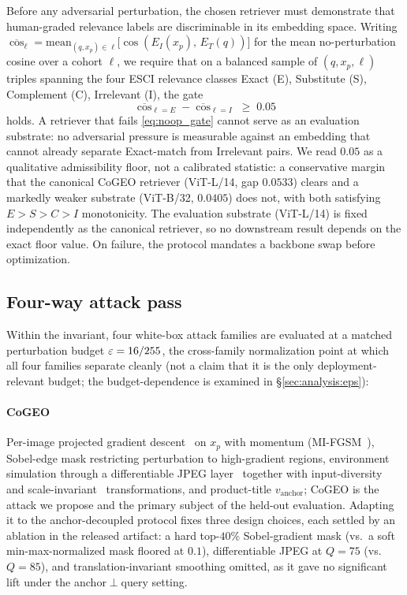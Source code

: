 Before any adversarial perturbation, the chosen retriever must demonstrate that human-graded relevance labels are discriminable in its embedding space. Writing $\overline{\cos}_{\ell} = \mathrm{mean}_{(q,x_p)\in\ell}\bigl[\cos(E_I(x_p),\,E_T(q))\bigr]$ for the mean no-perturbation cosine over a cohort $\ell$, we require that on a balanced sample of $(q, x_p, \ell)$ triples spanning the four ESCI relevance classes Exact (E), Substitute (S), Complement (C), Irrelevant (I), the gate
\begin{equation}
\overline{\cos}_{\ell=E} - \overline{\cos}_{\ell=I} \;\geq\; 0.05
\label{eq:noop_gate}
\end{equation}
holds.
A retriever that fails \eqref{eq:noop_gate} cannot serve as an evaluation substrate: no adversarial pressure is measurable against an embedding that cannot already separate Exact-match from Irrelevant pairs. We read $0.05$ as a qualitative admissibility floor, not a calibrated statistic: a conservative margin that the canonical CoGEO retriever (ViT-L/14, gap $0.0533$) clears and a markedly weaker substrate (ViT-B/32, $0.0405$) does not, with both satisfying $E\!>\!S\!>\!C\!>\!I$ monotonicity. The evaluation substrate (ViT-L/14) is fixed independently as the canonical retriever, so no downstream result depends on the exact floor value. On failure, the protocol mandates a backbone swap before optimization.

\subsection{Four-way attack pass}
\label{sec:method:attacks}

Within the invariant, four white-box attack families are evaluated at a matched perturbation budget $\varepsilon = 16/255$, the cross-family normalization point at which all four families separate cleanly (not a claim that it is the only deployment-relevant budget; the budget-dependence is examined in \S\ref{sec:analysis:eps}):

\paragraph{CoGEO} Per-image projected gradient descent~\cite{madry2018pgd,goodfellow2015fgsm} on $x_p$ with momentum (MI-FGSM~\cite{dong2018mifgsm}), Sobel-edge mask restricting perturbation to high-gradient regions, environment simulation through a differentiable JPEG layer~\cite{shin2017diffjpeg} together with input-diversity~\cite{xie2019dim} and scale-invariant~\cite{lin2020sim} transformations, and product-title $v_{\text{anchor}}$; CoGEO is the attack we propose and the primary subject of the held-out evaluation. Adapting it to the anchor-decoupled protocol fixes three design choices, each settled by an ablation in the released artifact: a hard top-$40\%$ Sobel-gradient mask (vs.\ a soft min-max-normalized mask floored at $0.1$), differentiable JPEG at $Q{=}75$ (vs.\ $Q{=}85$), and translation-invariant smoothing omitted, as it gave no significant lift under the anchor$\perp$query setting.

